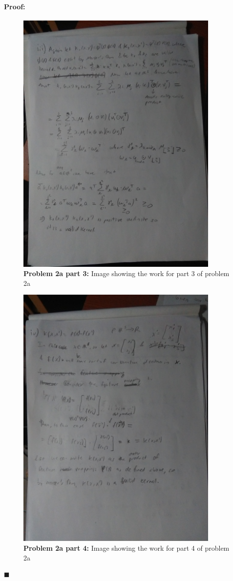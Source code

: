 \documentclass[12pt]{article}
\newenvironment{proof}{\paragraph{Proof: }}{\hfill$\blacksquare$}
\begin{document}
\begin{proof}
\begin{figure}[!htbp]
\centering
\includegraphics[width=10cm]{hw3_prob2a_3.jpg}
\caption{\textbf{Problem 2a part 3:} Image showing the work for part 3 of problem 2a}
\end{figure}

\begin{figure}[!htbp]
\centering
\includegraphics[width=10cm]{hw3_prob2a_4.jpg}
\caption{\textbf{Problem 2a part 4:} Image showing the work for part 4 of problem 2a}
\end{figure}


\end{proof}
\end{document}
